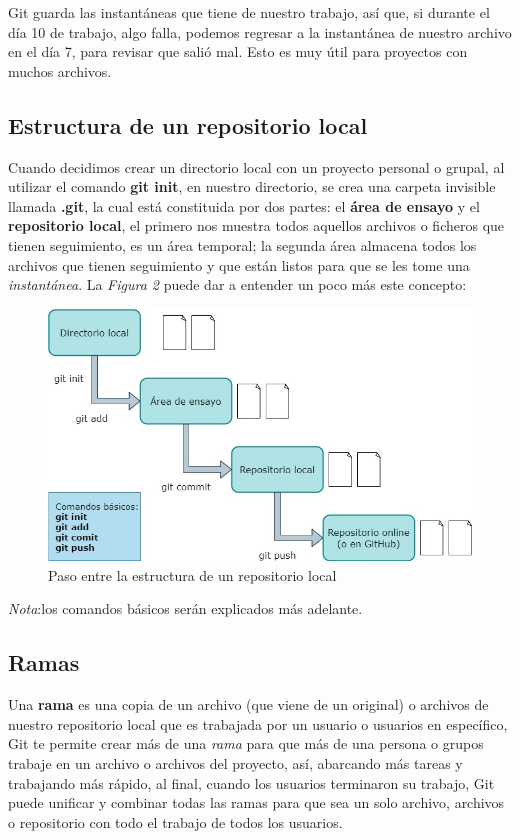 Git guarda las instantáneas que tiene de nuestro trabajo, así que, si durante el día 10 de trabajo, algo falla, podemos regresar a la instantánea de nuestro archivo en el día 7, para revisar que salió mal. Esto es muy útil para proyectos con muchos archivos.



\subsection{Estructura de un repositorio local}
\hspace{0.55cm}Cuando decidimos crear un directorio local con un proyecto personal o grupal, al utilizar el comando \textbf{git init}, en nuestro directorio, se crea una carpeta invisible llamada\textbf{ .git}, la cual está constituida por dos partes: el \textbf{área de ensayo} y el \textbf{repositorio local}, el primero nos muestra todos aquellos archivos o ficheros que tienen seguimiento, es un área temporal; la segunda área almacena todos los archivos que tienen seguimiento y que están listos para que se les tome una \textit{instantánea}. La \textit{Figura 2} puede dar a entender un poco más este concepto:
\begin{figure}[H]
    \begin{center}
        \caption{Paso entre la estructura de un repositorio local}
        \label{fig: 2}
        \includegraphics[width=\textwidth]{conceptos/g2.jpg}
    \end{center}
\end{figure}
\textit{Nota}:los comandos básicos serán explicados más adelante.



\subsection{Ramas}
\hspace{0.55cm}Una \textbf{rama} es una copia de un archivo (que viene de un original) o archivos de nuestro repositorio local que es trabajada por un usuario o usuarios en específico, Git te permite crear más de una \textit{rama} para que más de una persona o grupos trabaje en un archivo o archivos del proyecto, así, abarcando más tareas y trabajando más rápido, al final, cuando los usuarios terminaron su trabajo, Git puede unificar y combinar todas las ramas para que sea un solo archivo, archivos o repositorio con todo el trabajo de todos los usuarios.

